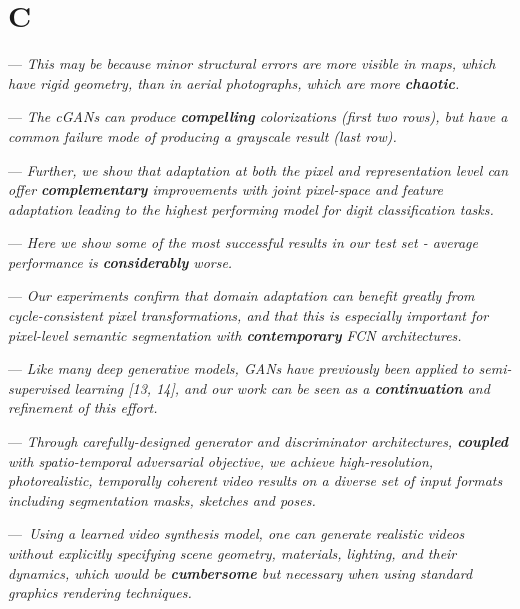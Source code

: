 \section{C}


 --- \textit{This may be because minor structural errors are more visible in maps, which have rigid geometry, than in aerial photographs, which are more \textbf{chaotic}.}

 --- \textit{The cGANs can produce \textbf{compelling} colorizations (first two rows), but have a common failure mode of producing a grayscale result (last row).}

 --- \textit{ Further, we show that adaptation at both the pixel and representation level can offer \textbf{complementary} improvements with joint pixel-space and feature adaptation leading to the highest performing model for digit classification tasks.}


 --- \textit{Here we show some of the most successful results in our test set - average performance is \textbf{considerably} worse.}

 --- \textit{Our experiments confirm that domain adaptation can benefit greatly from cycle-consistent pixel transformations, and that this is especially important for pixel-level semantic segmentation with \textbf{contemporary} FCN architectures.}


 --- \textit{Like many deep generative models, GANs have previously been applied to semi-supervised learning [13, 14], and our work can be seen as a \textbf{continuation} and refinement of this effort.}

 --- \textit{Through carefully-designed generator and discriminator architectures, \textbf{coupled} with spatio-temporal adversarial objective, we achieve high-resolution, photorealistic, temporally coherent video results on a diverse set of input formats including segmentation masks, sketches and poses.}

 ---~\textit{Using a learned video synthesis model, one can generate realistic videos without explicitly specifying scene geometry, materials, lighting, and their dynamics, which would be \textbf{cumbersome} but necessary when using standard graphics rendering techniques.}


